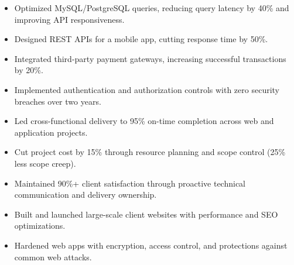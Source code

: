 \begin{itemize}
\item Optimized MySQL/PostgreSQL queries, reducing query latency by 40\% and improving API responsiveness.
\item Designed REST APIs for a mobile app, cutting response time by 50\%.
\item Integrated third-party payment gateways, increasing successful transactions by 20\%.
\item Implemented authentication and authorization controls with zero security breaches over two years.
\end{itemize}
\divider

\begin{itemize}
\item Led cross-functional delivery to 95\% on-time completion across web and application projects.
\item Cut project cost by 15\% through resource planning and scope control (25\% less scope creep).
\item Maintained 90\%+ client satisfaction through proactive technical communication and delivery ownership.
\end{itemize}
\divider

\begin{itemize}
\item Built and launched large-scale client websites with performance and SEO optimizations.
\item Hardened web apps with encryption, access control, and protections against common web attacks.
\end{itemize}

\newpage
\switchcolumn
